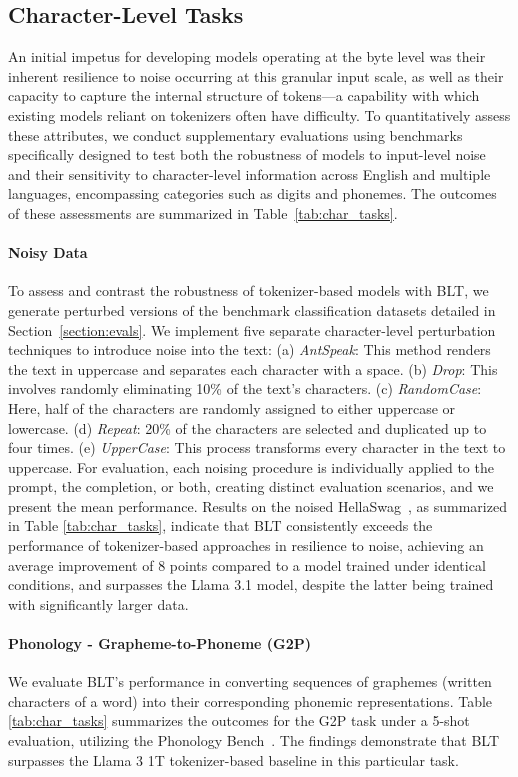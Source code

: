 \subsection{Character-Level Tasks}

An initial impetus for developing models operating at the byte level was their inherent resilience to noise occurring at this granular input scale, as well as their capacity to capture the internal structure of tokens—a capability with which existing models reliant on tokenizers often have difficulty. To quantitatively assess these attributes, we conduct supplementary evaluations using benchmarks specifically designed to test both the robustness of models to input-level noise and their sensitivity to character-level information across English and multiple languages, encompassing categories such as digits and phonemes. The outcomes of these assessments are summarized in Table~\ref{tab:char_tasks}.

\paragraph{Noisy Data} To assess and contrast the robustness of tokenizer-based models with {\textsc BLT}, we generate perturbed versions of the benchmark classification datasets detailed in Section~\ref{section:evals}. We implement five separate character-level perturbation techniques to introduce noise into the text: (a) \textit{AntSpeak}: This method renders the text in uppercase and separates each character with a space. (b) \textit{Drop}: This involves randomly eliminating 10\% of the text's characters. (c) \textit{RandomCase}: Here, half of the characters are randomly assigned to either uppercase or lowercase. (d) \textit{Repeat}: 20\% of the characters are selected and duplicated up to four times. (e) \textit{UpperCase}: This process transforms every character in the text to uppercase. For evaluation, each noising procedure is individually applied to the prompt, the completion, or both, creating distinct evaluation scenarios, and we present the mean performance. Results on the noised HellaSwag~\citep{Eval_hellaswag}, as summarized in Table \ref{tab:char_tasks}, indicate that {\textsc BLT} consistently exceeds the performance of tokenizer-based approaches in resilience to noise, achieving an average improvement of 8 points compared to a model trained under identical conditions, and surpasses the Llama 3.1 model, despite the latter being trained with significantly larger data.

\paragraph{Phonology - Grapheme-to-Phoneme (G2P)} We evaluate {\textsc BLT}'s performance in converting sequences of graphemes (written characters of a word) into their corresponding phonemic representations. Table \ref{tab:char_tasks} summarizes the outcomes for the G2P task under a 5-shot evaluation, utilizing the Phonology Bench~\citep{suvarna2024phonologybench}. The findings demonstrate that {\textsc BLT} surpasses the Llama 3 1T tokenizer-based baseline in this particular task.

